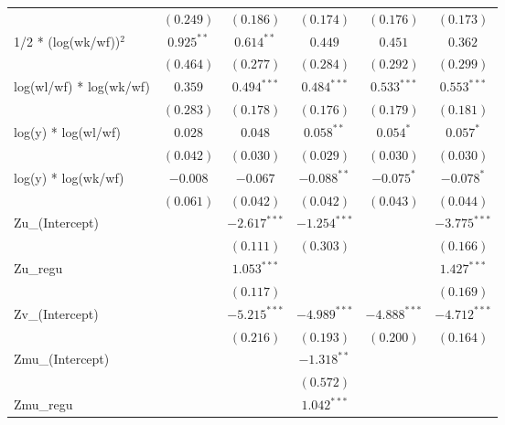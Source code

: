 \documentclass[nojss]{jss}
\begin{document}
\begin{table}
\begin{adjustbox}{width=1\textwidth}
\begin{tabular}{l c c c c c}
                        & $(0.249)$     & $(0.186)$      & $(0.174)$      & $(0.176)$      & $(0.173)$      \\
1/2 * (log(wk/wf))$^2$  & $0.925^{**}$  & $0.614^{**}$   & $0.449$        & $0.451$        & $0.362$        \\
                        & $(0.464)$     & $(0.277)$      & $(0.284)$      & $(0.292)$      & $(0.299)$      \\
log(wl/wf) * log(wk/wf) & $0.359$       & $0.494^{***}$  & $0.484^{***}$  & $0.533^{***}$  & $0.553^{***}$  \\
                        & $(0.283)$     & $(0.178)$      & $(0.176)$      & $(0.179)$      & $(0.181)$      \\
log(y) * log(wl/wf)     & $0.028$       & $0.048$        & $0.058^{**}$   & $0.054^{*}$    & $0.057^{*}$    \\
                        & $(0.042)$     & $(0.030)$      & $(0.029)$      & $(0.030)$      & $(0.030)$      \\
log(y) * log(wk/wf)     & $-0.008$      & $-0.067$       & $-0.088^{**}$  & $-0.075^{*}$   & $-0.078^{*}$   \\
                        & $(0.061)$     & $(0.042)$      & $(0.042)$      & $(0.043)$      & $(0.044)$      \\
Zu\_(Intercept)         &               & $-2.617^{***}$ & $-1.254^{***}$ &                & $-3.775^{***}$ \\
                        &               & $(0.111)$      & $(0.303)$      &                & $(0.166)$      \\
Zu\_regu                &               & $1.053^{***}$  &                &                & $1.427^{***}$  \\
                        &               & $(0.117)$      &                &                & $(0.169)$      \\
Zv\_(Intercept)         &               & $-5.215^{***}$ & $-4.989^{***}$ & $-4.888^{***}$ & $-4.712^{***}$ \\
                        &               & $(0.216)$      & $(0.193)$      & $(0.200)$      & $(0.164)$      \\
Zmu\_(Intercept)        &               &                & $-1.318^{**}$  &                &                \\
                        &               &                & $(0.572)$      &                &                \\
Zmu\_regu               &               &                & $1.042^{***}$  &                &                \\

\end{tabular}
\end{adjustbox}
\end{table}
\end{document}
